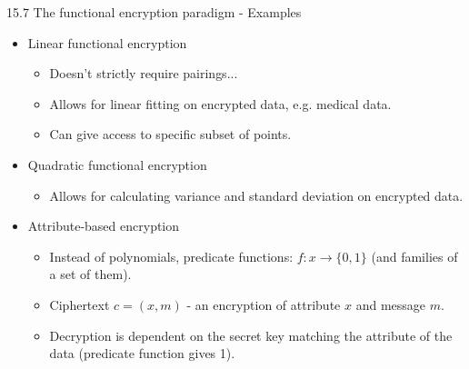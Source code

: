 \documentclass[aspectratio=169,xcolor=dvipsnames]{beamer}
\begin{document}
\begin{frame}{15.7 The functional encryption paradigm - Examples}
\begin{itemize}
    \item Linear functional encryption
    \begin{itemize}
        \item Doesn't strictly require pairings...
        \item Allows for linear fitting on encrypted data, e.g. medical data.
        \item Can give access to specific subset of points.
    \end{itemize}
    \item Quadratic functional encryption
    \begin{itemize}
        \item Allows for calculating variance and standard deviation on encrypted data.
    \end{itemize}
    \item Attribute-based encryption
    \begin{itemize}
        \item Instead of polynomials, predicate functions: $f: x \rightarrow \{0, 1\}$ (and families of a set of them).
        \item Ciphertext $c = (x,m)$ - an encryption of attribute $x$ and message $m$.
        \item Decryption is dependent on the secret key matching the attribute of the data (predicate function gives 1).
    \end{itemize}
\end{itemize}
    
\end{frame}
\end{document}
